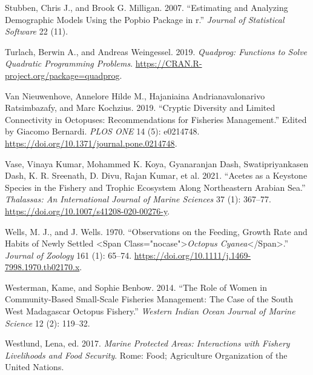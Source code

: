 \documentclass[
]{article}
\newlength{\cslhangindent}
\newlength{\cslentryspacingunit} %
\newenvironment{CSLReferences}[2] %
 {%
  \setlength{\parindent}{0pt}
  \ifodd #1
  \let\oldpar\par
  \def\par{\hangindent=\cslhangindent\oldpar}
  \fi
  \setlength{\parskip}{#2\cslentryspacingunit}
 }%
 {}
\begin{document}
\begin{CSLReferences}{1}{0}
\leavevmode{}%
Stubben, Chris J., and Brook G. Milligan. 2007. {``Estimating and Analyzing Demographic Models Using the Popbio Package in r.''} \emph{Journal of Statistical Software} 22 (11).

\leavevmode{}%
Turlach, Berwin A., and Andreas Weingessel. 2019. \emph{Quadprog: Functions to Solve Quadratic Programming Problems}. \url{https://CRAN.R-project.org/package=quadprog}.

\leavevmode{}%
Van Nieuwenhove, Annelore Hilde M., Hajaniaina Andrianavalonarivo Ratsimbazafy, and Marc Kochzius. 2019. {``Cryptic Diversity and Limited Connectivity in Octopuses: {Recommendations} for Fisheries Management.''} Edited by Giacomo Bernardi. \emph{PLOS ONE} 14 (5): e0214748. \url{https://doi.org/10.1371/journal.pone.0214748}.

\leavevmode{}%
Vase, Vinaya Kumar, Mohammed K. Koya, Gyanaranjan Dash, Swatipriyankasen Dash, K. R. Sreenath, D. Divu, Rajan Kumar, et al. 2021. {``Acetes as a {Keystone} {Species} in the {Fishery} and {Trophic} {Ecosystem} {Along} {Northeastern} {Arabian} {Sea}.''} \emph{Thalassas: An International Journal of Marine Sciences} 37 (1): 367--77. \url{https://doi.org/10.1007/s41208-020-00276-y}.

\leavevmode{}%
Wells, M. J., and J. Wells. 1970. {``Observations on the Feeding, Growth Rate and Habits of Newly Settled {\textless{}}Span Class="nocase"{\textgreater{}}\emph{{Octopus} Cyanea}{\textless{}}/Span{\textgreater{}}.''} \emph{Journal of Zoology} 161 (1): 65--74. \url{https://doi.org/10.1111/j.1469-7998.1970.tb02170.x}.

\leavevmode{}%
Westerman, Kame, and Sophie Benbow. 2014. {``The {Role} of {Women} in {Community}-Based {Small}-{Scale} {Fisheries} {Management}: {The} {Case} of the {South} {West} {Madagascar} {Octopus} {Fishery}.''} \emph{Western Indian Ocean Journal of Marine Science} 12 (2): 119--32.

\leavevmode{}%
Westlund, Lena, ed. 2017. \emph{Marine Protected Areas: Interactions with Fishery Livelihoods and Food Security}. Rome: Food; Agriculture Organization of the United Nations.


\end{CSLReferences}
\end{document}
